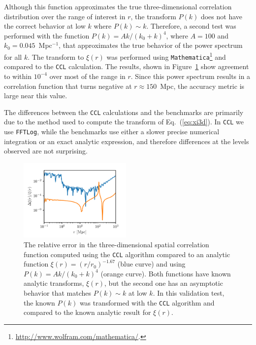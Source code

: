 \documentclass[\docopts]{\docclass}
\newcommand{\ccl}{{\tt CCL}\xspace}
\begin{document}
Although this function approximates the true three-dimensional correlation distribution over the range of interest in $r$, the transform $P(k)$ does not have the correct behavior at low $k$ where $P(k) \sim  k$. Therefore, a second test was performed with the function $P(k) = A k / (k_0 + k)^4$, where $A = 100$ and $k_0 = 0.045$~Mpc$^{-1}$, that approximates the true behavior of the power spectrum for all $k$.
The transform to $\xi(r)$ was performed using {\tt Mathematica}\footnote{\url{http://www.wolfram.com/mathematica/}.} and compared to the \ccl calculation. The results, shown in Figure~\ref{fig:analytic_xi} show agreement to within $10^{-4}$ over most of the range in $r$. Since this power spectrum results in a correlation function that turns negative at $r \approx 150$~Mpc, the accuracy metric is large near this value. 

The differences between the \ccl calculations and the benchmarks are primarily due to the method used to compute the transform of Eq.~(\ref{eq:xi3d}). In \ccl we use {\tt FFTLog}, while the benchmarks use either a slower precise numerical integration or an exact analytic expression, and therefore differences at the levels observed are not surprising.

\begin{figure}[htbp]
\centering
\includegraphics[width=0.49\textwidth]{3dcorr_analytic}
\caption{The relative error in the three-dimensional spatial correlation function computed using the \ccl algorithm compared to an analytic function $\xi(r) = (r/r_0)^{-1.67}$ (blue curve) and using $P(k) = A k / (k_0 + k)^4$ (orange curve). Both functions have known analytic transforms, $\xi(r)$, but the second one has an asymptotic behavior that matches $P(k)\sim k$ at low $k$. In this validation test, the known $P(k)$ was transformed with the \ccl algorithm and compared to the known analytic result for $\xi(r)$.}
\label{fig:analytic_xi}
\end{figure}
\end{document}

